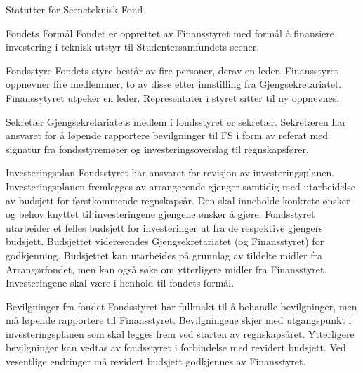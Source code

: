 \begin{fond}{Statutter for Sceneteknisk Fond}
    \begin{fondsparagraf}{Fondets Formål}
        Fondet er opprettet av Finansstyret med formål å finansiere investering i teknisk
        utstyr til Studentersamfundets scener.
    \end{fondsparagraf}

    \begin{fondsparagraf}{Fondsstyre}
        Fondets styre består av fire personer, derav en leder. Finansstyret oppnevner fire
        medlemmer, to av disse etter innstilling fra Gjengsekretariatet. Finanssytyret
        utpeker en leder. Representater i styret sitter til ny oppnevnes.
    \end{fondsparagraf}

    \begin{fondsparagraf}{Sekretær}
        Gjengsekretariatets medlem i fondsstyret er sekretær. Sekretæren har ansvaret for å
        løpende rapportere bevilgninger til
        FS i form av referat med signatur fra fondsstyremøter og investeringsoverslag til
        regnskapsfører.
    \end{fondsparagraf}

    \begin{fondsparagraf}{Investeringsplan}
        Fondsstyret har ansvaret for revisjon av investeringsplanen. Investeringsplanen fremlegges
        av arrangerende gjenger samtidig med utarbeidelse av budsjett for førstkommende regnskapsår. Den skal inneholde
        konkrete ønsker og behov knyttet til investeringene gjengene ønsker å gjøre. Fondsstyret utarbeider et felles
        budsjett for investeringer ut fra de respektive gjengers budsjett. Budsjettet videresendes Gjengsekretariatet (og Finansstyret)
        for godkjenning. Budsjettet kan utarbeides på grunnlag av tildelte midler fra Arrangørfondet, men kan også søke om
        ytterligere midler fra Finansstyret. Investeringene skal være i henhold til fondets formål.
    \end{fondsparagraf}

    \begin{fondsparagraf}{Bevilgninger fra fondet}
        Fondsstyret har fullmakt til å behandle bevilgninger, men må løpende rapportere til
        Finansstyret. Bevilgningene skjer
        med utgangspunkt i investeringsplanen som skal legges frem ved starten av regnskapsåret.
        Ytterligere bevilgninger
        kan vedtas av fondsstyret i forbindelse med revidert budsjett. Ved vesentlige endringer må
        revidert budsjett godkjennes av Finansstyret.
    \end{fondsparagraf}


\end{fond}
